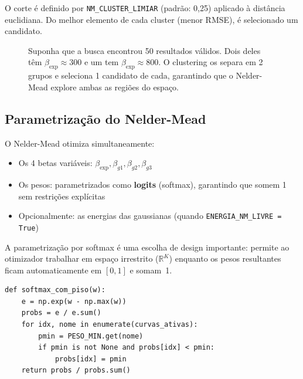 \documentclass[12pt,a4paper]{report}
\newcommand{\code}[1]{\texttt{#1}}
\begin{document}
O corte é definido por \code{NM\_CLUSTER\_LIMIAR} (padrão: 0,25) aplicado
à distância euclidiana. Do melhor elemento de cada cluster (menor RMSE),
é selecionado um candidato.

\begin{figure}[h!]
\centering
\begin{minipage}{0.85\textwidth}
\begin{description}[leftmargin=2em, style=nextline]
  \item[\textbf{Exemplo com 3 clusters:}]
    Suponha que a busca encontrou 50 resultados válidos. Dois deles
    têm $\beta_{\text{exp}} \approx 300$ e um tem $\beta_{\text{exp}} \approx 800$.
    O clustering os separa em 2 grupos e seleciona 1 candidato de cada,
    garantindo que o Nelder-Mead explore ambas as regiões do espaço.
\end{description}
\end{minipage}
\end{figure}

\subsection{Parametrização do Nelder-Mead}

O Nelder-Mead otimiza simultaneamente:
\begin{itemize}
  \item Os 4 betas variáveis: $\beta_{\text{exp}}, \beta_{g1}, \beta_{g2}, \beta_{g3}$
  \item Os pesos: parametrizados como \textbf{logits} (softmax), garantindo
    que somem 1 sem restrições explícitas
  \item Opcionalmente: as energias das gaussianas (quando \code{ENERGIA\_NM\_LIVRE = True})
\end{itemize}

A parametrização por softmax é uma escolha de design importante:
permite ao otimizador trabalhar em espaço irrestrito ($\mathbb{R}^K$)
enquanto os pesos resultantes ficam automaticamente em $[0,1]$ e somam~1.

\begin{lstlisting}[caption={Softmax com piso de peso mínimo}]
def softmax_com_piso(w):
    e = np.exp(w - np.max(w))
    probs = e / e.sum()
    for idx, nome in enumerate(curvas_ativas):
        pmin = PESO_MIN.get(nome)
        if pmin is not None and probs[idx] < pmin:
            probs[idx] = pmin
    return probs / probs.sum()
\end{lstlisting}
\end{document}
